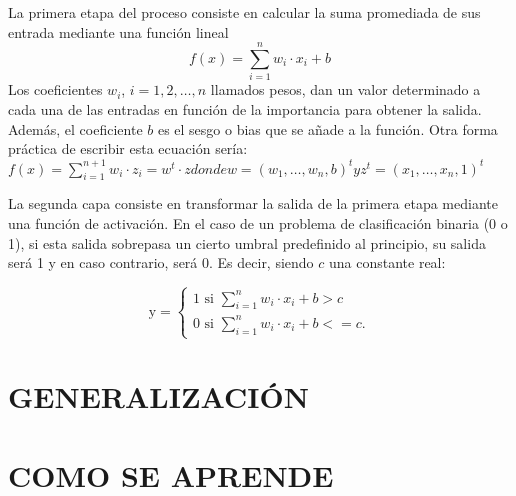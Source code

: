 La primera etapa del proceso consiste en calcular la suma promediada de sus entrada mediante una función lineal
\begin{equation}
f(x) = \sum_{i=1}^{n} w_i \cdot x_i + b
\end{equation}
Los coeficientes $w_i$, $i=1,2, \ldots, n$ llamados pesos, dan un valor determinado a cada una de las entradas en función de la importancia para obtener la salida. Además, el coeficiente $b$ es el sesgo o bias que se añade a la función. Otra forma práctica de escribir esta ecuación sería: $f(x) = \sum_{i=1}^{n+1} w_i \cdot z_i = w^t\cdot z  donde w = (w_1, \ldots, w_n, b)^t y z^t = (x_1, \ldots, x_n, 1)^t$

La segunda capa consiste en transformar la salida de la primera etapa mediante una función de activación. En el caso de un problema de clasificación binaria (0 o 1), si esta salida sobrepasa un cierto umbral predefinido al principio, su salida será 1 y en caso contrario, será 0. Es decir, siendo $c$ una constante real:

\begin{equation}
\text{y} = 
\begin{cases} 
1  \text{  si  }  \sum_{i=1}^{n} w_i \cdot x_i + b > c\\
0  \text{  si  }  \sum_{i=1}^{n} w_i \cdot x_i + b <= c.
\end{cases}
\end{equation}












\section{GENERALIZACIÓN}
\section{COMO SE APRENDE}
